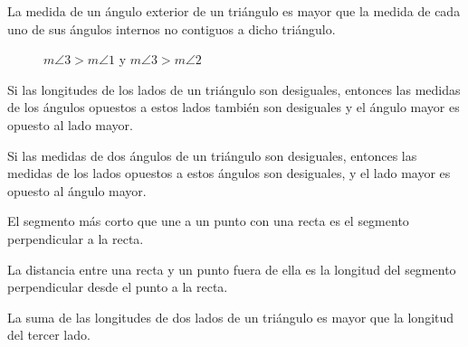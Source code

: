 \begin{theorem}
La medida de un ángulo exterior de un triángulo es mayor que la medida de cada uno de sus ángulos internos no contiguos a dicho triángulo.

    \begin{figure}[!h]
        \centering
        
        \caption{$m\angle{3} > m\angle{1}$ y $m\angle{3} > m\angle{2}$}
        \label{fig:intext-angles-diff}
    \end{figure}

\end{theorem}

\begin{theorem}
    Si las longitudes de los lados de un triángulo son desiguales, entonces las medidas de los ángulos opuestos a estos lados también son desiguales y el ángulo mayor es opuesto al lado mayor.

\end{theorem}

\begin{theorem}
    Si las medidas de dos ángulos de un triángulo son desiguales, entonces las medidas de los lados opuestos a estos ángulos son desiguales, y el lado mayor es opuesto al ángulo mayor.
\end{theorem}

\begin{theorem}
    El segmento más corto que une a un punto con una recta es el segmento perpendicular a la recta.

    \begin{figure}[!h]
        \centering
        
        \label{fig:theorem6}
    \end{figure}
    
\end{theorem}

\begin{definition}
    La distancia entre una recta y un punto fuera de ella es la longitud del segmento perpendicular desde el punto a la recta.
\end{definition}

\begin{theorem}
    La suma de las longitudes de dos lados de un triángulo es mayor que la longitud del tercer lado.
\end{theorem}

